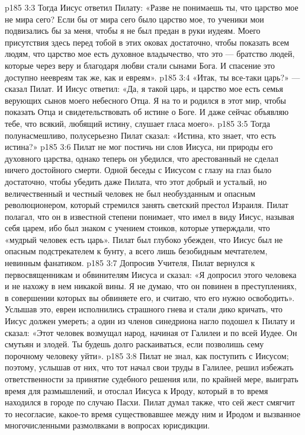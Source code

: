 \vs p185 3:3 Тогда Иисус ответил Пилату: «Разве не понимаешь ты, что царство мое не мира сего? Если бы от мира сего было царство мое, то ученики мои подвизались бы за меня, чтобы я не был предан в руки иудеям. Моего присутствия здесь перед тобой в этих оковах достаточно, чтобы показать всем людям, что царство мое есть духовное владычество, что это --- братство людей, которые через веру и благодаря любви стали сынами Бога. И спасение это доступно неевреям так же, как и евреям».
\vs p185 3:4 «Итак, ты все\hyp{}таки царь?» --- сказал Пилат. И Иисус ответил: «Да, я такой царь, и царство мое есть семья верующих сынов моего небесного Отца. Я на то и родился в этот мир, чтобы показать Отца и свидетельствовать об истине о Боге. И даже сейчас объявляю тебе, что всякий, любящий истину, слушает гласа моего».
\vs p185 3:5 Тогда полунасмешливо, полусерьезно Пилат сказал: «Истина, кто знает, что есть истина?»
\vs p185 3:6 Пилат не мог постичь ни слов Иисуса, ни природы его духовного царства, однако теперь он убедился, что арестованный не сделал ничего достойного смерти. Одной беседы с Иисусом с глазу на глаз было достаточно, чтобы убедить даже Пилата, что этот добрый и усталый, но величественный и честный человек не был необузданным и опасным революционером, который стремился занять светский престол Израиля. Пилат полагал, что он в известной степени понимает, что имел в виду Иисус, называя себя царем, ибо был знаком с учением стоиков, которые утверждали, что «мудрый человек есть царь». Пилат был глубоко убежден, что Иисус был не опасным подстрекателем к бунту, а всего лишь безобидным мечтателем, невинным фанатиком.
\vs p185 3:7 Допросив Учителя, Пилат вернулся к первосвященникам и обвинителям Иисуса и сказал: «Я допросил этого человека и не нахожу в нем никакой вины. Я не думаю, что он повинен в преступлениях, в совершении которых вы обвиняете его, и считаю, что его нужно освободить». Услышав это, евреи исполнились страшного гнева и стали дико кричать, что Иисус должен умереть; а один из членов синедриона нагло подошел к Пилату и сказал: «Этот человек возмущал народ, начиная от Галилеи и по всей Иудее. Он смутьян и злодей. Ты будешь долго раскаиваться, если позволишь сему порочному человеку уйти».
\vs p185 3:8 Пилат не знал, как поступить с Иисусом; поэтому, услышав от них, что тот начал свои труды в Галилее, решил избежать ответственности за принятие судебного решения или, по крайней мере, выиграть время для размышлений, и отослал Иисуса к Ироду, который в то время находился в городе по случаю Пасхи. Пилат думал также, что сей жест смягчит то несогласие, какое\hyp{}то время существовавшее между ним и Иродом и вызванное многочисленными размолвками в вопросах юрисдикции.
